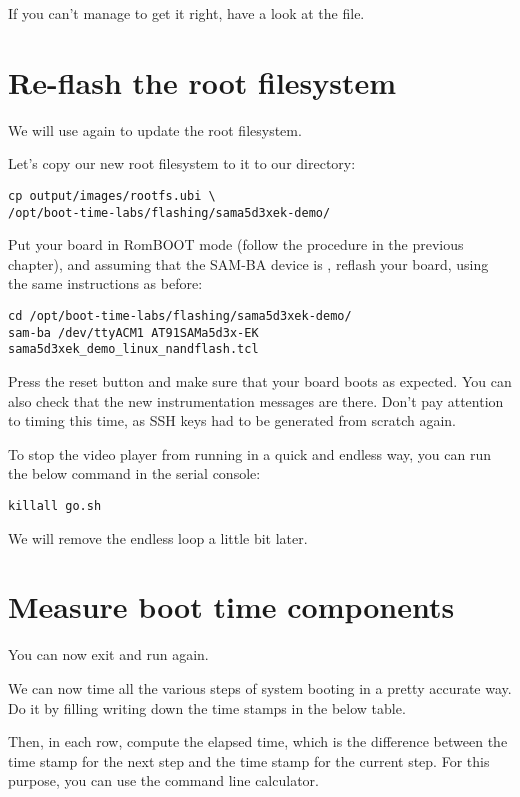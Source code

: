 If you can't manage to get it right, have a look at the
 file.

\section{Re-flash the root filesystem}

We will use  again to update the root filesystem.

Let's copy our new root filesystem to it to our  directory:

\begin{verbatim}
cp output/images/rootfs.ubi \
/opt/boot-time-labs/flashing/sama5d3xek-demo/
\end{verbatim}

Put your board in RomBOOT mode (follow the procedure in the previous
chapter), and assuming that the SAM-BA device is \code{/dev/ttyACM1},
reflash your board, using the same instructions as before:

\begin{verbatim}
cd /opt/boot-time-labs/flashing/sama5d3xek-demo/
sam-ba /dev/ttyACM1 AT91SAMa5d3x-EK sama5d3xek_demo_linux_nandflash.tcl
\end{verbatim}

Press the reset button and make sure that your board boots as
expected. You can also check that the new instrumentation messages are
there. Don't pay attention to timing this time, as SSH keys had to be
generated from scratch again.

To stop the video player from running in a quick and endless way,
you can run the below command in the serial console:

\begin{verbatim}
killall go.sh
\end{verbatim}

We will remove the endless loop a little bit later.

\section{Measure boot time components}

You can now exit  and run  again.

We can now time all the various steps of system booting in a pretty
accurate way. Do it by filling writing down the time stamps in the below
table.

Then, in each row, compute the elapsed time, which is the difference
between the time stamp for the next step and the time stamp for the current step.
For this purpose, you can use the \code{bc -l} command line calculator.

